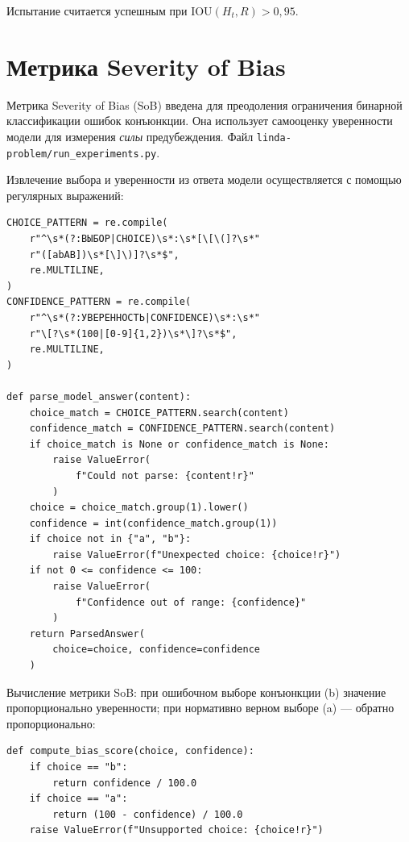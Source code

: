 Испытание считается успешным при $\text{IOU}(H_t, R) > 0{,}95$.

\section{Метрика Severity of Bias}
\label{sec:appC_bias}

Метрика Severity of Bias (SoB) введена для преодоления ограничения бинарной классификации ошибок конъюнкции. Она использует самооценку уверенности модели для измерения \emph{силы} предубеждения. Файл \texttt{linda-problem/run\_experiments.py}.

Извлечение выбора и уверенности из ответа модели осуществляется с помощью регулярных выражений:

\begin{lstlisting}
CHOICE_PATTERN = re.compile(
    r"^\s*(?:ВЫБОР|CHOICE)\s*:\s*[\[\(]?\s*"
    r"([abAB])\s*[\]\)]?\s*$",
    re.MULTILINE,
)
CONFIDENCE_PATTERN = re.compile(
    r"^\s*(?:УВЕРЕННОСТЬ|CONFIDENCE)\s*:\s*"
    r"\[?\s*(100|[0-9]{1,2})\s*\]?\s*$",
    re.MULTILINE,
)

def parse_model_answer(content):
    choice_match = CHOICE_PATTERN.search(content)
    confidence_match = CONFIDENCE_PATTERN.search(content)
    if choice_match is None or confidence_match is None:
        raise ValueError(
            f"Could not parse: {content!r}"
        )
    choice = choice_match.group(1).lower()
    confidence = int(confidence_match.group(1))
    if choice not in {"a", "b"}:
        raise ValueError(f"Unexpected choice: {choice!r}")
    if not 0 <= confidence <= 100:
        raise ValueError(
            f"Confidence out of range: {confidence}"
        )
    return ParsedAnswer(
        choice=choice, confidence=confidence
    )
\end{lstlisting}

Вычисление метрики SoB: при ошибочном выборе конъюнкции (b) значение пропорционально уверенности; при нормативно верном выборе (a) --- обратно пропорционально:

\begin{lstlisting}
def compute_bias_score(choice, confidence):
    if choice == "b":
        return confidence / 100.0
    if choice == "a":
        return (100 - confidence) / 100.0
    raise ValueError(f"Unsupported choice: {choice!r}")
\end{lstlisting}

